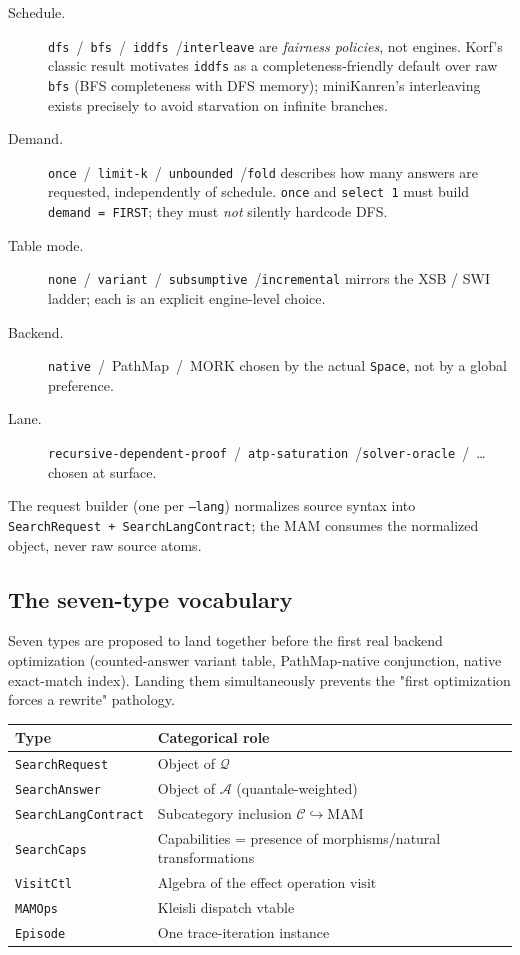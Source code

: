 \documentclass[11pt]{article}
\newcommand{\code}[1]{\texttt{#1}}
\newcommand{\PathMap}{\textup{PathMap}}
\begin{document}
\begin{description}
\item[Schedule.]  \code{dfs}~/~\code{bfs}~/~\code{iddfs}~/\code{interleave}
  are \emph{fairness policies}, not engines.  Korf's classic result
  motivates \code{iddfs} as a completeness-friendly default over raw
  \code{bfs} (BFS completeness with DFS memory); miniKanren's
  interleaving exists precisely to avoid starvation on infinite
  branches.
\item[Demand.]  \code{once}~/~\code{limit-k}~/~\code{unbounded}~/\code{fold}
  describes how many answers are requested, independently of schedule.
  \code{once} and \code{select~1} must build \code{demand = FIRST};
  they must \emph{not} silently hardcode DFS.
\item[Table mode.]  \code{none}~/~\code{variant}~/~\code{subsumptive}~/\code{incremental}
  mirrors the XSB / SWI ladder; each is an explicit engine-level choice.
\item[Backend.]  \code{native}~/~\PathMap{}~/~MORK chosen by the
  actual \code{Space}, not by a global preference.
\item[Lane.]  \code{recursive-dependent-proof}~/~\code{atp-saturation}~/\code{solver-oracle}~/~\dots{}
  chosen at surface.
\end{description}

The request builder (one per \code{--lang}) normalizes source syntax
into \code{SearchRequest~+~SearchLangContract}; the MAM consumes the
normalized object, never raw source atoms.

\subsection{The seven-type vocabulary}

Seven types are proposed to land together before the first real
backend optimization (counted-answer variant table, \PathMap{}-native
conjunction, native exact-match index).  Landing them simultaneously
prevents the "first optimization forces a rewrite" pathology.

\begin{center}
\begin{tabular}{ll}
\toprule
\textbf{Type} & \textbf{Categorical role} \\
\midrule
\code{SearchRequest} & Object of $\mathcal{Q}$ \\
\code{SearchAnswer} & Object of $\mathcal{A}$ (quantale-weighted) \\
\code{SearchLangContract} & Subcategory inclusion $\mathcal{C} \hookrightarrow \mathrm{MAM}$ \\
\code{SearchCaps} & Capabilities = presence of morphisms/natural transformations \\
\code{VisitCtl} & Algebra of the effect operation $\mathrm{visit}$ \\
\code{MAMOps} & Kleisli dispatch vtable \\
\code{Episode} & One trace-iteration instance \\
\bottomrule
\end{tabular}
\end{center}
\end{document}
